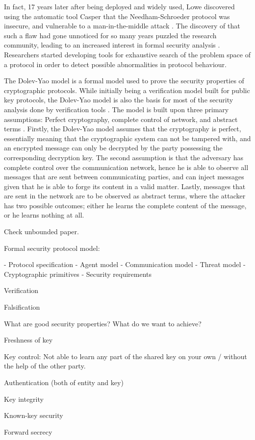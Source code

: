 In fact, 17 years later after being deployed and widely used, Lowe discovered using the automatic tool Casper that the Needham-Schroeder protocol was insecure, and vulnerable to a man-in-the-middle attack \cite{basin2011model} \cite{lowe1996}. The discovery of that such a flaw had gone unnoticed for so many years puzzled the research community, leading to an increased interest in formal security analysis \cite{cremers2009comparing}. Researchers started developing tools for exhaustive search of the problem space of a protocol in order to detect possible abnormalities in protocol behaviour. 




The Dolev-Yao model is a formal model used to prove the security properties of cryptographic protocols. While initially being a verification model built for public key protocols, the Dolev-Yao model is also the basis for most of the security analysis done by verification tools \cite{cremers2005operational}. The model is built upon three primary assumptions: Perfect cryptography, complete control of network, and abstract terms \cite{dolev1983security}. Firstly, the Dolev-Yao model assumes that the cryptography is perfect, essentially meaning that the cryptographic system can not be tampered with, and an encrypted message can only be decrypted by the party possessing the corresponding decryption key. The second assumption is that the adversary has complete control over the communication network, hence he is able to observe all messages that are sent between communicating parties, and can inject messages given that he is able to forge its content in a valid matter. Lastly, messages that are sent in the network are to be observed as abstract terms, where the attacker has two possible outcomes; either he learns the complete content of the message, or he learns nothing at all. 

Check unbounded paper.

Formal security protocol model\cite{cremers2005operational}:

- Protocol specification
- Agent model
- Communication model
- Threat model
- Cryptographic primitives
- Security requirements


Verification

Falsification

What are good security properties? What do we want to achieve? 



Freshness of key

Key control: Not able to learn any part of the shared key on your own / without the help of the other party.


Authentication (both of entity and key)

Key integrity


Known-key security

Forward secrecy


